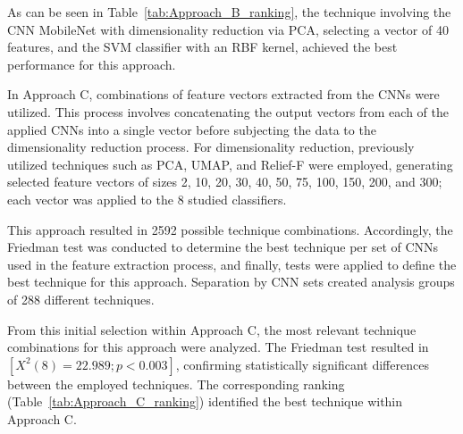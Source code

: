 \documentclass[final,5p,times,twocolumn]{elsarticle}
\begin{document}
As can be seen in Table~\ref{tab:Approach_B_ranking}, the technique involving the CNN MobileNet with dimensionality reduction via PCA, selecting a vector of 40 features, and the SVM classifier with an RBF kernel, achieved the best performance for this approach.

In Approach C, combinations of feature vectors extracted from the CNNs were utilized. This process involves concatenating the output vectors from each of the applied CNNs into a single vector before subjecting the data to the dimensionality reduction process. For dimensionality reduction, previously utilized techniques such as PCA, UMAP, and Relief-F were employed, generating selected feature vectors of sizes 2, 10, 20, 30, 40, 50, 75, 100, 150, 200, and 300; each vector was applied to the 8 studied classifiers.

This approach resulted in 2592 possible technique combinations. Accordingly, the Friedman test was conducted to determine the best technique per set of CNNs used in the feature extraction process, and finally, tests were applied to define the best technique for this approach. Separation by CNN sets created analysis groups of 288 different techniques.

From this initial selection within Approach C, the most relevant technique combinations for this approach were analyzed. The Friedman test resulted in $[X^2(8)=22.989; p<0.003]$, confirming statistically significant differences between the employed techniques. The corresponding ranking (Table~\ref{tab:Approach_C_ranking}) identified the best technique within Approach C.
\end{document}
